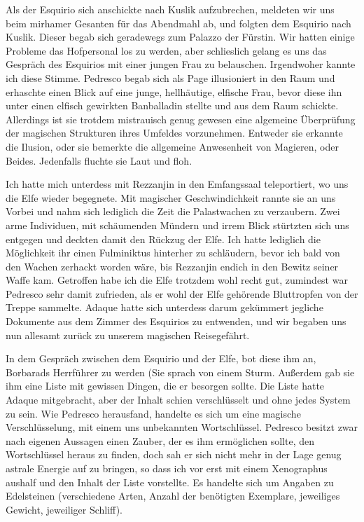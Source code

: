 Als der Esquirio sich anschickte nach Kuslik aufzubrechen, meldeten wir uns beim mirhamer Gesanten für das Abendmahl ab, und folgten dem Esquirio nach Kuslik. Dieser begab sich geradewegs zum Palazzo der Fürstin. Wir hatten einige Probleme das Hofpersonal los zu werden, aber schlieslich gelang es uns das Gespräch des Esquirios mit einer jungen Frau zu belauschen. Irgendwoher kannte ich diese Stimme. Pedresco begab sich als Page illusioniert in den Raum und erhaschte einen Blick auf eine junge, hellhäutige, elfische Frau, bevor diese ihn unter einen elfisch gewirkten Banballadin stellte und aus dem Raum schickte. Allerdings ist sie trotdem mistrauisch genug gewesen eine algemeine Überprüfung der magischen Strukturen ihres Umfeldes vorzunehmen. Entweder sie erkannte die Ilusion, oder sie bemerkte die allgemeine Anwesenheit von Magieren, oder Beides. Jedenfalls fluchte sie Laut und floh.

Ich hatte mich unterdess mit Rezzanjin in den Emfangssaal teleportiert, wo uns die Elfe wieder begegnete. Mit magischer Geschwindichkeit rannte sie an uns Vorbei und nahm sich lediglich die Zeit die Palastwachen zu verzaubern. Zwei arme Individuen, mit schäumenden Mündern und irrem Blick stürtzten sich uns entgegen und deckten damit den Rückzug der Elfe. Ich hatte lediglich die Möglichkeit ihr einen Fulminiktus hinterher zu schläudern, bevor ich bald von den Wachen zerhackt worden wäre, bis Rezzanjin endich in den Bewitz seiner Waffe kam. Getroffen habe ich die Elfe trotzdem wohl recht gut, zumindest war Pedresco sehr damit zufrieden, als er wohl der Elfe gehörende Bluttropfen von der Treppe sammelte.
Adaque hatte sich unterdess darum gekümmert jegliche Dokumente aus dem Zimmer des Esquirios zu entwenden, und wir begaben uns nun allesamt zurück zu unserem magischen Reisegefährt.

In dem Gespräch zwischen dem Esquirio und der Elfe, bot diese ihm an, Borbarads Herrführer zu werden (Sie sprach von einem Sturm. Außerdem gab sie ihm eine Liste mit gewissen Dingen, die er besorgen sollte. Die Liste hatte Adaque mitgebracht, aber der Inhalt schien verschlüsselt und ohne jedes System zu sein. Wie Pedresco herausfand, handelte es sich um eine magische Verschlüsselung, mit einem uns unbekannten Wortschlüssel. Pedresco besitzt zwar nach eigenen Aussagen einen Zauber, der es ihm ermöglichen sollte, den Wortschlüssel heraus zu finden, doch sah er sich nicht mehr in der Lage genug astrale Energie auf zu bringen, so dass ich vor erst mit einem Xenographus aushalf und den Inhalt der Liste vorstellte. Es handelte sich um Angaben zu Edelsteinen (verschiedene Arten, Anzahl der benötigten Exemplare, jeweiliges Gewicht, jeweiliger Schliff).

